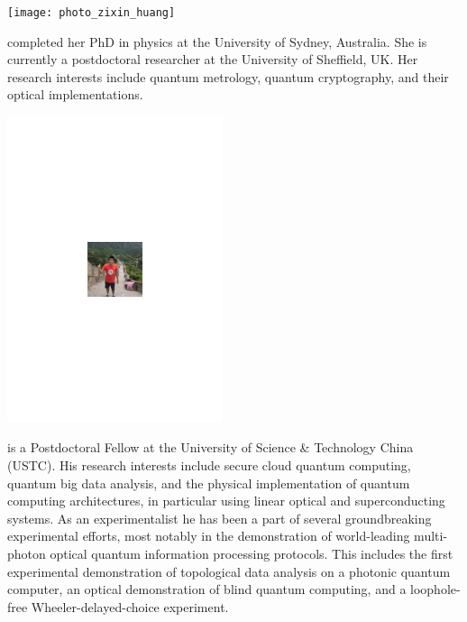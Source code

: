 %
%

\begin{center}
\texttt{[image: photo\_zixin\_huang]}
\end{center}

 completed her PhD in physics at the University of Sydney, Australia. She is currently a postdoctoral researcher at the University of Sheffield, UK. Her research interests include quantum metrology, quantum cryptography, and their optical implementations.


%
%

\begin{center}
\includegraphics[clip=true, width=0.475\textwidth]{photo_heliang_huang}
\end{center}

 is a Postdoctoral Fellow at the University of Science \& Technology China (USTC). His research interests include secure cloud quantum computing, quantum big data analysis, and the physical implementation of quantum computing architectures, in particular using linear optical and superconducting systems. As an experimentalist he has been a part of several groundbreaking experimental efforts, most notably in the demonstration of world-leading multi-photon optical quantum information processing protocols. This includes the first experimental demonstration of topological data analysis on a photonic quantum computer, an optical demonstration of blind quantum computing, and a loophole-free Wheeler-delayed-choice experiment.

%
%

